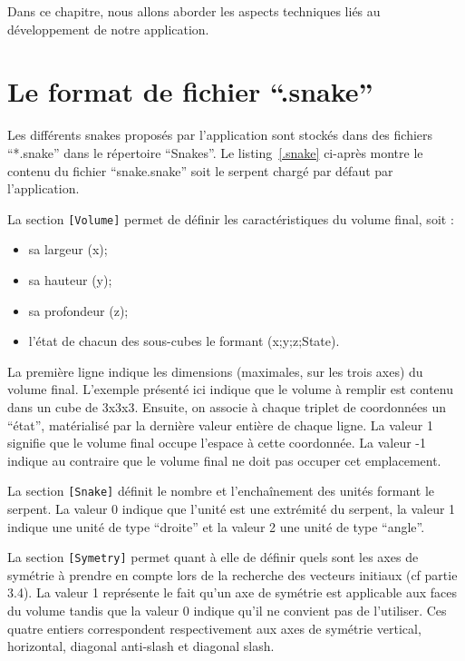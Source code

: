 Dans ce chapitre, nous allons aborder les aspects techniques liés au développement de notre application.

\section{Le format de fichier ``.snake''}
Les différents snakes proposés par l'application sont stockés dans des fichiers ``*.snake'' dans le répertoire ``Snakes''. Le listing~\ref{.snake} ci-après montre le contenu du fichier ``snake.snake'' soit le serpent chargé par défaut par l'application.\newline

La section \verb|[Volume]| permet de définir les caractéristiques du volume final, soit :
\begin{itemize}
 \item sa largeur (x);
 \item sa hauteur (y);
 \item sa profondeur (z);
 \item l'état de chacun des sous-cubes le formant (x;y;z;State).
\end{itemize}

La première ligne indique les dimensions (maximales, sur les trois axes) du volume final. L'exemple présenté ici indique que le volume à remplir est contenu dans un cube de 3x3x3. 
Ensuite, on associe à chaque triplet de coordonnées un ``état'', matérialisé par la dernière valeur entière de chaque ligne. La valeur 1 signifie que le volume final occupe l'espace à cette coordonnée. La valeur -1 indique au contraire que le volume final ne doit pas occuper cet emplacement.\newline

La section \verb|[Snake]| définit le nombre et l’enchaînement des unités formant le serpent. La valeur 0 indique que l'unité est une extrémité du serpent, la valeur 1 indique une unité de type ``droite'' et la valeur 2 une unité de type ``angle''.\newline

La section \verb|[Symetry]| permet quant à elle de définir quels sont les axes de symétrie à prendre en compte lors de la recherche des vecteurs initiaux (cf partie 3.4). La valeur 1 représente le fait qu'un axe de symétrie est applicable aux faces du volume tandis que la valeur 0 indique qu'il ne convient pas de l'utiliser. Ces quatre entiers correspondent respectivement aux axes de symétrie vertical, horizontal, diagonal anti-slash et diagonal slash.

